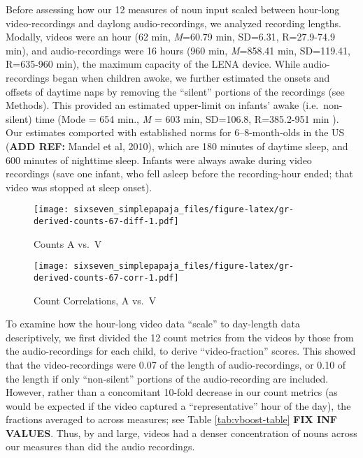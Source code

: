 \documentclass[floatsintext,man]{apa6}
\theoremstyle{definition}
\theoremstyle{definition}
\theoremstyle{definition}
\theoremstyle{remark}
\begin{document}
Before assessing how our 12 measures of noun input scaled between
hour-long video-recordings and daylong audio-recordings, we analyzed
recording lengths. Modally, videos were an hour (62 min, \emph{M}=60.79
min, SD=6.31, R=27.9-74.9 min), and audio-recordings were 16 hours (960
min, \emph{M}=858.41 min, SD=119.41, R=635-960 min), the maximum
capacity of the LENA device. While audio-recordings began when children
awoke, we further estimated the onsets and offsets of daytime naps by
removing the \enquote{silent} portions of the recordings (see Methods).
This provided an estimated upper-limit on infants' awake
(i.e.~non-silent) time (Mode = 654 min., \emph{M} = 603 min, SD=106.8,
R=385.2-951 min ). Our estimates comported with established norms for
6--8-month-olds in the US (\textbf{ADD REF:} Mandel et al, 2010), which
are 180 minutes of daytime sleep, and 600 minutes of nighttime sleep.
Infants were always awake during video recordings (save one infant, who
fell asleep before the recording-hour ended; that video was stopped at
sleep onset).

\begin{figure}
\centering
\texttt{[image: sixseven\_simplepapaja\_files/figure-latex/gr-derived-counts-67-diff-1.pdf]}
\caption{\label{fig:gr-derived-counts-67-diff}Counts A vs.~V}
\end{figure}

\begin{figure}
\centering
\texttt{[image: sixseven\_simplepapaja\_files/figure-latex/gr-derived-counts-67-corr-1.pdf]}
\caption{\label{fig:gr-derived-counts-67-corr}Count Correlations, A vs.~V}
\end{figure}

To examine how the hour-long video data \enquote{scale} to day-length
data descriptively, we first divided the 12 count metrics from the
videos by those from the audio-recordings for each child, to derive
\enquote{video-fraction} scores. This showed that the video-recordings
were 0.07 of the length of audio-recordings, or 0.10 of the length if
only \enquote{non-silent} portions of the audio-recording are included.
However, rather than a concomitant 10-fold decrease in our count metrics
(as would be expected if the video captured a \enquote{representative}
hour of the day), the fractions averaged to across measures; see Table
\ref{tab:vboost-table} \textbf{FIX INF VALUES}. Thus, by and large,
videos had a denser concentration of nouns across our measures than did
the audio recordings.
\end{document}

